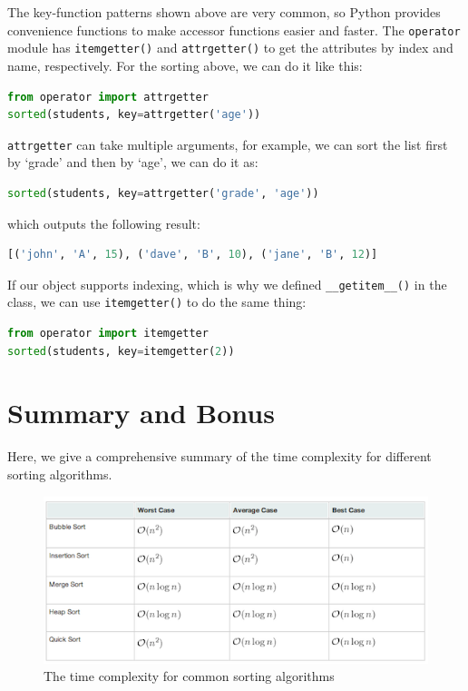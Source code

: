 \documentclass[../main.tex]{subfiles}
\begin{document}
The key-function patterns shown above are very common, so Python provides convenience functions to make accessor functions easier and faster. The \texttt{operator} module has \texttt{itemgetter()} and \texttt{attrgetter()} to get the attributes by index and name, respectively. For the sorting above, we can do it like this:
\begin{lstlisting}[language = Python]
from operator import attrgetter
sorted(students, key=attrgetter('age'))
\end{lstlisting}
\texttt{attrgetter} can take multiple arguments, for example, we can sort the list first by `grade' and then by `age', we can do it as:
\begin{lstlisting}[language = Python]
sorted(students, key=attrgetter('grade', 'age'))
\end{lstlisting}
which outputs the following result:
\begin{lstlisting}[language=Python]
[('john', 'A', 15), ('dave', 'B', 10), ('jane', 'B', 12)]
\end{lstlisting}
If our object supports indexing, which is why we defined \texttt{\_\_getitem\_\_()} in the class, we can use \texttt{itemgetter()} to do the same thing:
\begin{lstlisting}[language=Python]
from operator import itemgetter
sorted(students, key=itemgetter(2))
\end{lstlisting}


\section{Summary and Bonus}
Here, we give a comprehensive summary of the time complexity for different sorting algorithms.
\begin{figure}[h]
    \centering
    \includegraphics[width=1\columnwidth]{fig/time_complexity_sorting.png}
    \caption{The time complexity for common sorting algorithms}
    \label{fig:sort_complexity}
\end{figure}
\end{document}
